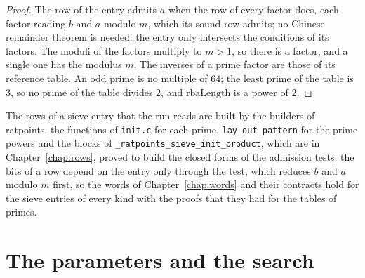 \begin{proof}
  \leanok
  The row of the entry admits $a$ when the row of every factor does, each factor reading $b$ and
  $a$ modulo $m$, which its sound row admits; no Chinese remainder theorem is needed: the entry
  only intersects the conditions of its factors. The moduli of the factors multiply to $m > 1$, so
  there is a factor, and a single one has the modulus $m$. The inverses of a prime factor are those
  of its reference table. An odd prime is no multiple of $64$; the least prime of the table is $3$,
  so no prime of the table divides $2$, and $\mathrm{rbaLength}$ is a power of $2$.
\end{proof}

The rows of a sieve entry that the run reads are built by the builders of ratpoints, the functions
of \verb|init.c| for each prime, \verb|lay_out_pattern| for the prime powers and the blocks of
\verb|_ratpoints_sieve_init_product|, which are in Chapter~\ref{chap:rows}, proved to build the
closed forms of the admission tests; the bits of a row depend on the entry only through the test,
which reduces $b$ and $a$ modulo $m$ first, so the words of Chapter~\ref{chap:words} and their
contracts hold for the sieve entries of every kind with the proofs that they had for the tables of
primes.

\section{The parameters and the search}\label{sec:tablesSearch}

